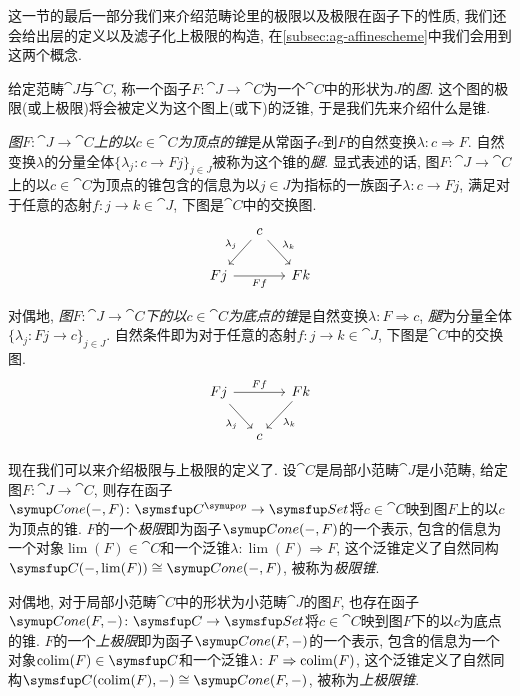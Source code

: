 \bigskip

这一节的最后一部分我们来介绍范畴论里的极限以及极限在函子下的性质, 我们还会给出层的定义以及滤子化上极限的构造, 在\ref{subsec:ag-affinescheme}中我们会用到这两个概念.

给定范畴$\cat{J}$与$\cat{C}$, 称一个函子$F\colon \cat{J}\to \cat{C}$为一个$\cat{C}$中的形状为$J$的\emph{图}. 这个图的极限(或上极限)将会被定义为这个图上(或下)的泛锥, 于是我们先来介绍什么是锥.

\emph{图$F\colon \cat{J}\to\cat{C}$上的以$c\in\cat{C}$为顶点的锥}是从常函子$c$到$F$的自然变换$\lambda\colon c\Rightarrow F$. 自然变换$\lambda$的分量全体$\{\lambda_j\colon c\to Fj\}_{j\in J}$被称为这个锥的\emph{腿}. 显式表述的话, 图$F\colon \cat{J}\to\cat{C}$上的以$c\in\cat{C}$为顶点的锥包含的信息为以$j\in J$为指标的一族函子$\lambda\colon c\to Fj$, 满足对于任意的态射$f\colon j\to k\in \cat{J}$, 下图是$\cat{C}$中的交换图.
\begin{equation*}
  \begin{tikzcd}[column sep=small]
    & c & \\
    Fj & & Fk
    \arrow[from=1-2,]{2-1}[swap]{\lambda_j}
    \arrow[from=1-2,]{2-3}[]{\lambda_k}
    \arrow[from=2-1,]{2-3}[below]{Ff}
  \end{tikzcd}
\end{equation*}

对偶地, \emph{图$F\colon \cat{J}\to\cat{C}$下的以$c\in\cat{C}$为底点的锥}是自然变换$\lambda\colon F\Rightarrow c$, \emph{腿}为分量全体$\{\lambda_j\colon Fj\to c\}_{j\in J}$. 自然条件即为对于任意的态射$f\colon j\to k\in \cat{J}$, 下图是$\cat{C}$中的交换图.
\begin{equation*}
  \begin{tikzcd}[column sep=small]
    Fj & & Fk\\
    & c &
    \arrow[from=1-1,]{2-2}[swap]{\lambda_j}
    \arrow[from=1-1,]{1-3}[]{Ff}
    \arrow[from=1-3,]{2-2}[]{\lambda_k}
  \end{tikzcd}
\end{equation*}

现在我们可以来介绍极限与上极限的定义了. 设$\cat{C}$是局部小范畴$\cat{J}$是小范畴, 给定图$F\colon\cat{J}\to\cat{C}$, 则存在函子$\Cone(-, F)\colon \cat{C}^{\op}\to\cat{Set}$将$c\in \cat{C}$映到图$F$上的以$c$为顶点的锥. $F$的一个\emph{极限}即为函子$\Cone (-, F)$的一个表示, 包含的信息为一个对象$\lim (F)\in \cat{C}$和一个泛锥$\lambda\colon\lim (F)\Rightarrow F$, 这个泛锥定义了自然同构$\cat{C}(-, \lim (F))\cong \Cone (-, F)$, 被称为\emph{极限锥}.

对偶地, 对于局部小范畴$\cat{C}$中的形状为小范畴$\cat{J}$的图$F$, 也存在函子$\Cone(F, -)\colon \cat{C}\to\cat{Set}$将$c\in \cat{C}$映到图$F$下的以$c$为底点的锥. $F$的一个\emph{上极限}即为函子$\Cone (F, -)$的一个表示, 包含的信息为一个对象$\colim (F)\in \cat{C}$和一个泛锥$\lambda\colon F\Rightarrow \operatorname{colim} (F)$, 这个泛锥定义了自然同构$\cat{C}(\colim (F), -)\cong \Cone (F, -)$, 被称为\emph{上极限锥}.

